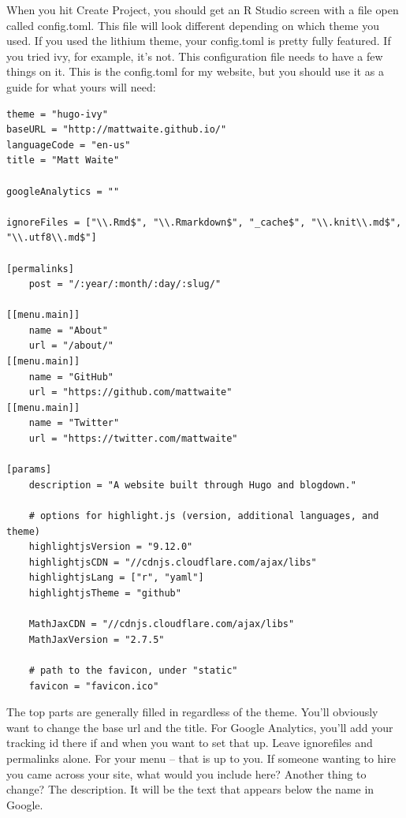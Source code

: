 \documentclass[
]{book}
\begin{document}
When you hit Create Project, you should get an R Studio screen with a file open called config.toml. This file will look different depending on which theme you used. If you used the lithium theme, your config.toml is pretty fully featured. If you tried ivy, for example, it's not. This configuration file needs to have a few things on it. This is the config.toml for my website, but you should use it as a guide for what yours will need:

\begin{verbatim}
theme = "hugo-ivy"
baseURL = "http://mattwaite.github.io/"
languageCode = "en-us"
title = "Matt Waite"

googleAnalytics = ""

ignoreFiles = ["\\.Rmd$", "\\.Rmarkdown$", "_cache$", "\\.knit\\.md$", "\\.utf8\\.md$"]

[permalinks]
    post = "/:year/:month/:day/:slug/"

[[menu.main]]
    name = "About"
    url = "/about/"
[[menu.main]]
    name = "GitHub"
    url = "https://github.com/mattwaite"
[[menu.main]]
    name = "Twitter"
    url = "https://twitter.com/mattwaite"

[params]
    description = "A website built through Hugo and blogdown."

    # options for highlight.js (version, additional languages, and theme)
    highlightjsVersion = "9.12.0"
    highlightjsCDN = "//cdnjs.cloudflare.com/ajax/libs"
    highlightjsLang = ["r", "yaml"]
    highlightjsTheme = "github"

    MathJaxCDN = "//cdnjs.cloudflare.com/ajax/libs"
    MathJaxVersion = "2.7.5"

    # path to the favicon, under "static"
    favicon = "favicon.ico"
\end{verbatim}

The top parts are generally filled in regardless of the theme. You'll obviously want to change the base url and the title. For Google Analytics, you'll add your tracking id there if and when you want to set that up. Leave ignorefiles and permalinks alone. For your menu -- that is up to you. If someone wanting to hire you came across your site, what would you include here? Another thing to change? The description. It will be the text that appears below the name in Google.
\end{document}
